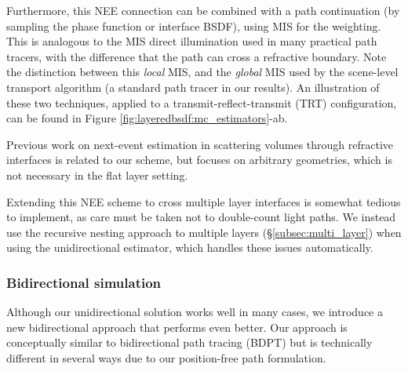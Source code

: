Furthermore, this NEE connection can be combined with a path continuation (by sampling the phase function or interface BSDF), using MIS for the weighting. This is analogous to the MIS direct illumination used in many practical path tracers, with the difference that the path can cross a refractive boundary. Note the distinction between this \emph{local} MIS, and the \emph{global} MIS used by the scene-level transport algorithm (a standard path tracer in our results). An illustration of these two techniques, applied to a transmit-reflect-transmit (TRT) configuration, can be found in Figure \ref{fig:layeredbsdf:mc_estimators}-ab.



Previous work on next-event estimation in scattering volumes through refractive interfaces \cite{walter2009single,koerner2016subdivision} is related to our scheme, but focuses on arbitrary geometries, which is not necessary in the flat layer setting.

Extending this NEE scheme to cross multiple layer interfaces is somewhat tedious to implement, as care must be taken not to double-count light paths. We instead use the recursive nesting approach to multiple layers (\S\ref{subsec:multi_layer}) when using the unidirectional estimator, which handles these issues automatically.


\subsubsection{Bidirectional simulation}
\label{sssec:ours_bidir}

Although our unidirectional solution works well in many cases, we introduce a new bidirectional approach that performs even better.
Our approach is conceptually similar to bidirectional path tracing (BDPT) but is technically different in several ways due to our position-free path formulation.

